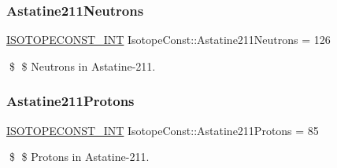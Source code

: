 \subsubsection{\texorpdfstring{Astatine211\+Neutrons}{Astatine211Neutrons}}
{\footnotesize\ttfamily \mbox{\hyperlink{group___isotope_const-_macros_ga5f18360b3e99483a35c32d789e62621c}{I\+S\+O\+T\+O\+P\+E\+C\+O\+N\+S\+T\+\_\+\+I\+NT}} Isotope\+Const\+::\+Astatine211\+Neutrons = 126}

\$ \$ Neutrons in Astatine-\/211. \mbox{\label{group___isotope_const-_astatine-_at211_gaeafbe0ef05905b1779872b256dd90137}} 
\subsubsection{\texorpdfstring{Astatine211\+Protons}{Astatine211Protons}}
{\footnotesize\ttfamily \mbox{\hyperlink{group___isotope_const-_macros_ga5f18360b3e99483a35c32d789e62621c}{I\+S\+O\+T\+O\+P\+E\+C\+O\+N\+S\+T\+\_\+\+I\+NT}} Isotope\+Const\+::\+Astatine211\+Protons = 85}

\$ \$ Protons in Astatine-\/211. 